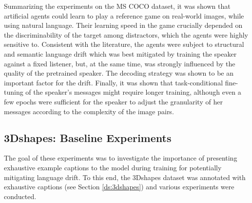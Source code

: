 Summarizing the experiments on the MS COCO dataset, it was shown that artificial agents could learn to play a reference game on real-world images, while using natural language. Their learning speed in the game crucially depended on the discriminability of the target among distractors, which the agents were highly sensitive to. Consistent with the literature, the agents were subject to structural and semantic language drift which was best mitigated by training the speaker against a fixed listener, but, at the same time, was strongly influenced by the quality of the pretrained speaker. The decoding strategy was shown to be an important factor for the drift. Finally, it was shown that task-conditional fine-tuning of the speaker's messages might require longer training, although even a few epochs were sufficient for the speaker to adjust the granularity of her messages according to the complexity of the image pairs.

\subsection{3Dshapes: Baseline Experiments}
\label{expt:3dshapes_baseline}

The goal of these experiments was to investigate the importance of presenting exhaustive example captions to the model during training for potentially mitigating language drift. To this end, the 3Dshapes dataset was annotated with exhaustive captions (see Section \ref{ds:3dshapes}) and various experiments were conducted. %

